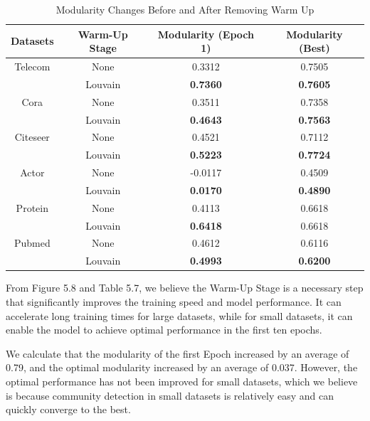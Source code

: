 \documentclass[ %
                    author={Tengyao Tu},
                supervisor={Dr. James Pope},
                    degree={MSc},
                     title={A New Perspective on Graph Community Detection: Combining Traditional Methods with Deep Learning Approaches},
                  subtitle={Applying to Telecom Networks and Diverse Datasets},
                      type={},
                      year={2024}]{dissertation}
\begin{document}
\begin{table}[!htbp] 
\centering 
\label{Basic Infomation} 
\caption{Modularity Changes Before and After Removing Warm Up} 
\vspace{5pt} 
\begin{tabular}{cccc} 
\hline 
Datasets&Warm-Up Stage&Modularity (Epoch 1)&Modularity (Best)\\ 
\hline
Telecom&None&0.3312&0.7505\\
&Louvain&\textbf{0.7360}&\textbf{0.7605}\\

\hline
Cora&None&0.3511&0.7358\\
&Louvain&\textbf{0.4643}&\textbf{0.7563}\\
\hline
Citeseer&None&0.4521&0.7112\\
&Louvain&\textbf{0.5223}&\textbf{0.7724}\\
\hline
Actor&None&-0.0117& 0.4509\\
&Louvain&\textbf{0.0170}&\textbf{0.4890}\\
\hline
Protein&None&0.4113& 0.6618\\
&Louvain&\textbf{0.6418}&0.6618\\
\hline
Pubmed&None&0.4612& 0.6116\\
&Louvain&\textbf{0.4993}&\textbf{0.6200}\\
\hline
\end{tabular}
\end{table}
From Figure 5.8 and Table 5.7, we believe the Warm-Up Stage is a necessary step that significantly improves the training speed and model performance. It can accelerate long training times for large datasets, while for small datasets, it can enable the model to achieve optimal performance in the first ten epochs. 

We calculate that the modularity of the first Epoch increased by an average of 0.79, and the optimal modularity increased by an average of 0.037. However, the optimal performance has not been improved for small datasets, which we believe is because community detection in small datasets is relatively easy and can quickly converge to the best.
\end{document}

